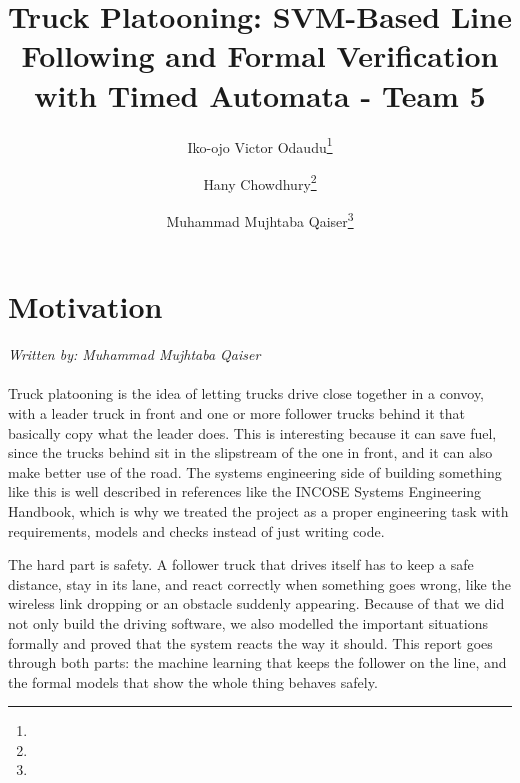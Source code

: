 \documentclass[english]{lni}
\begin{document}
\title[Truck Platooning]{Truck Platooning: SVM-Based Line Following and Formal Verification with Timed Automata - Team 5}
\author[Odaudu, Chowdhury, Qaiser]{%
	Iko-ojo Victor Odaudu\footnote{}
	\and Hany Chowdhury\footnote{}
	\and Muhammad Mujhtaba Qaiser\footnote{}%
}
\booktitle{} %
\maketitle

{\setcounter{tocdepth}{1}\tableofcontents}
\bigskip

\section{Motivation}
\textit{Written by: Muhammad Mujhtaba Qaiser}
\\~\\
Truck platooning is the idea of letting trucks drive close together in a convoy, with a leader truck in front and one or more follower trucks behind it that basically copy what the leader does. This is interesting because it can save fuel, since the trucks behind sit in the slipstream of the one in front, and it can also make better use of the road. The systems engineering side of building something like this is well described in references like the INCOSE Systems Engineering Handbook, which is why we treated the project as a proper engineering task with requirements, models and checks instead of just writing code.

The hard part is safety. A follower truck that drives itself has to keep a safe distance, stay in its lane, and react correctly when something goes wrong, like the wireless link dropping or an obstacle suddenly appearing. Because of that we did not only build the driving software, we also modelled the important situations formally and proved that the system reacts the way it should. This report goes through both parts: the machine learning that keeps the follower on the line, and the formal models that show the whole thing behaves safely.
\end{document}

